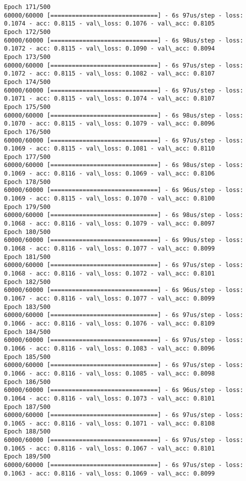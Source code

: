 \documentclass[11pt]{article}
\begin{document}
\begin{Verbatim}[commandchars=\\\{\}]
Epoch 171/500
60000/60000 [==============================] - 6s 97us/step - loss: 0.1074 - acc: 0.8115 - val\_loss: 0.1076 - val\_acc: 0.8105
Epoch 172/500
60000/60000 [==============================] - 6s 98us/step - loss: 0.1072 - acc: 0.8115 - val\_loss: 0.1090 - val\_acc: 0.8094
Epoch 173/500
60000/60000 [==============================] - 6s 97us/step - loss: 0.1072 - acc: 0.8115 - val\_loss: 0.1082 - val\_acc: 0.8107
Epoch 174/500
60000/60000 [==============================] - 6s 97us/step - loss: 0.1071 - acc: 0.8115 - val\_loss: 0.1074 - val\_acc: 0.8107
Epoch 175/500
60000/60000 [==============================] - 6s 98us/step - loss: 0.1070 - acc: 0.8115 - val\_loss: 0.1079 - val\_acc: 0.8096
Epoch 176/500
60000/60000 [==============================] - 6s 97us/step - loss: 0.1069 - acc: 0.8115 - val\_loss: 0.1081 - val\_acc: 0.8110
Epoch 177/500
60000/60000 [==============================] - 6s 98us/step - loss: 0.1069 - acc: 0.8116 - val\_loss: 0.1069 - val\_acc: 0.8106
Epoch 178/500
60000/60000 [==============================] - 6s 96us/step - loss: 0.1069 - acc: 0.8115 - val\_loss: 0.1070 - val\_acc: 0.8100
Epoch 179/500
60000/60000 [==============================] - 6s 98us/step - loss: 0.1068 - acc: 0.8116 - val\_loss: 0.1079 - val\_acc: 0.8097
Epoch 180/500
60000/60000 [==============================] - 6s 99us/step - loss: 0.1068 - acc: 0.8116 - val\_loss: 0.1077 - val\_acc: 0.8099
Epoch 181/500
60000/60000 [==============================] - 6s 97us/step - loss: 0.1068 - acc: 0.8116 - val\_loss: 0.1072 - val\_acc: 0.8101
Epoch 182/500
60000/60000 [==============================] - 6s 96us/step - loss: 0.1067 - acc: 0.8116 - val\_loss: 0.1077 - val\_acc: 0.8099
Epoch 183/500
60000/60000 [==============================] - 6s 97us/step - loss: 0.1066 - acc: 0.8116 - val\_loss: 0.1076 - val\_acc: 0.8109
Epoch 184/500
60000/60000 [==============================] - 6s 97us/step - loss: 0.1066 - acc: 0.8116 - val\_loss: 0.1083 - val\_acc: 0.8096
Epoch 185/500
60000/60000 [==============================] - 6s 97us/step - loss: 0.1066 - acc: 0.8116 - val\_loss: 0.1085 - val\_acc: 0.8098
Epoch 186/500
60000/60000 [==============================] - 6s 96us/step - loss: 0.1064 - acc: 0.8116 - val\_loss: 0.1073 - val\_acc: 0.8101
Epoch 187/500
60000/60000 [==============================] - 6s 97us/step - loss: 0.1065 - acc: 0.8116 - val\_loss: 0.1071 - val\_acc: 0.8108
Epoch 188/500
60000/60000 [==============================] - 6s 97us/step - loss: 0.1065 - acc: 0.8116 - val\_loss: 0.1067 - val\_acc: 0.8101
Epoch 189/500
60000/60000 [==============================] - 6s 97us/step - loss: 0.1063 - acc: 0.8116 - val\_loss: 0.1069 - val\_acc: 0.8099

\end{Verbatim}
\end{document}
